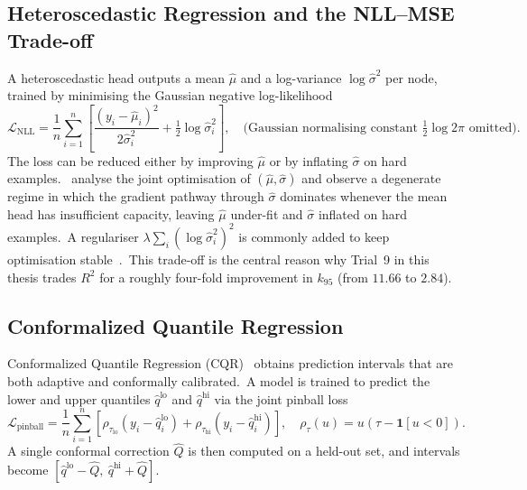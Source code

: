 \subsection{Heteroscedastic Regression and the NLL--MSE Trade-off}\label{sec:hetero_bg}

A heteroscedastic head outputs a mean $\hat\mu$ and a log-variance $\log\hat\sigma^2$ per node, trained by minimising the Gaussian negative log-likelihood
\begin{equation}\label{eq:hetero_nll_bg}
 \mathcal{L}_\text{NLL} = \frac{1}{n}\sum_{i=1}^{n} \left[\frac{(y_i - \hat\mu_i)^2}{2\hat\sigma_i^2} + \tfrac{1}{2}\log\hat\sigma_i^2\right]\!,\quad\text{(Gaussian normalising constant $\tfrac{1}{2}\log 2\pi$ omitted).}
\end{equation}
The loss can be reduced either by improving $\hat\mu$ or by inflating $\hat\sigma$ on hard examples.\ \textcite{seitzer2022pitfalls} analyse the joint optimisation of $(\hat\mu,\hat\sigma)$ and observe a degenerate regime in which the gradient pathway through $\hat\sigma$ dominates whenever the mean head has insufficient capacity, leaving $\hat\mu$ under-fit and $\hat\sigma$ inflated on hard examples.\ A regulariser $\lambda \sum_i (\log\hat\sigma_i^2)^2$ is commonly added to keep optimisation stable~\cite{seitzer2022pitfalls}.\ This trade-off is the central reason why Trial~9 in this thesis trades $R^2$ for a roughly four-fold improvement in $k_{95}$ (from $11.66$ to $2.84$).

\subsection{Conformalized Quantile Regression}\label{sec:cqr_bg}

Conformalized Quantile Regression (CQR)~\cite{romano2019conformalized} obtains prediction intervals that are both adaptive and conformally calibrated.\ A model is trained to predict the lower and upper quantiles $\hat q^\text{lo}$ and $\hat q^\text{hi}$ via the joint pinball loss
\begin{equation}\label{eq:pinball_bg}
 \mathcal{L}_\text{pinball} = \frac{1}{n}\sum_{i=1}^{n} \left[\rho_{\tau_\text{lo}}(y_i - \hat q_i^\text{lo}) + \rho_{\tau_\text{hi}}(y_i - \hat q_i^\text{hi})\right],
 \quad \rho_\tau(u) = u(\tau - \mathbf{1}[u<0]).
\end{equation}
A single conformal correction $\hat Q$ is then computed on a held-out set, and intervals become $[\hat q^\text{lo} - \hat Q,\ \hat q^\text{hi} + \hat Q]$.

